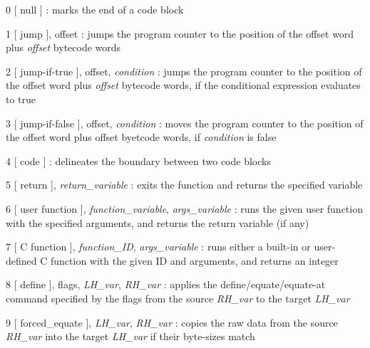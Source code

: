 \documentclass{article}
\begin{document}
\begin{description}
\item{0  [ null ]} :  marks the end of a code block

\item{1  [ jump ], offset} : jumps the program counter to the position of the offset word plus \emph{offset} bytecode words
\item{2  [ jump-if-true ], offset, \emph{condition}} : jumps the program counter to the position of the offset word plus \emph{offset} bytecode words, if the conditional expression evaluates to true
\item{3  [ jump-if-false ], offset, \emph{condition}} : moves the program counter to the position of the offset word plus offset byetcode words, if \emph{condition} is false

\item{4  [ code ]} : delineates the boundary between two code blocks
\item{5  [ return ], \emph{return\_variable}} :  exits the function and returns the specified variable
\item{6  [ user function ], \emph{function\_variable}, \emph{args\_variable}} : runs the given user function with the specified arguments, and returns the return variable (if any)
\item{7  [ C function ], \emph{function\_ID}, \emph{args\_variable}} : runs either a built-in or user-defined C function with the given ID and arguments, and returns an integer

\item{8  [ define ], flags, \emph{LH\_var}, \emph{RH\_var}} : applies the define/equate/equate-at command specified by the flags from the source \emph{RH\_var} to the target \emph{LH\_var}
\item{9  [ forced\_equate ], \emph{LH\_var}, \emph{RH\_var}} : copies the raw data from the source \emph{RH\_var} into the target \emph{LH\_var} if their byte-sizes match


\end{description}
\end{document}
